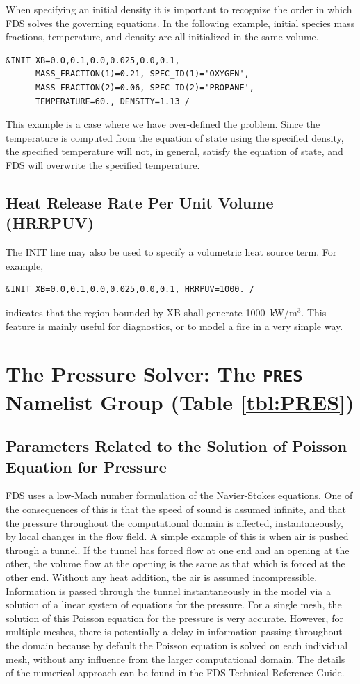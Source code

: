 \documentclass[11pt]{book}
\begin{document}
When specifying an initial density it is important to recognize the order in which FDS solves the governing equations. In the following example, initial species mass fractions, temperature, and density are all initialized in the same volume.
\begin{lstlisting}
&INIT XB=0.0,0.1,0.0,0.025,0.0,0.1,
      MASS_FRACTION(1)=0.21, SPEC_ID(1)='OXYGEN',
      MASS_FRACTION(2)=0.06, SPEC_ID(2)='PROPANE',
      TEMPERATURE=60., DENSITY=1.13 /
\end{lstlisting}
This example is a case where we have over-defined the problem. Since the temperature is computed from the equation of state using the specified density, the specified temperature will not, in general, satisfy the equation of state, and FDS will overwrite the specified temperature.

\subsection*{Heat Release Rate Per Unit Volume (HRRPUV)}

The {\ct INIT} line may also be used to specify a volumetric heat source term. For example,
\begin{lstlisting}
&INIT XB=0.0,0.1,0.0,0.025,0.0,0.1, HRRPUV=1000. /
\end{lstlisting}
indicates that the region bounded by {\ct XB} shall generate 1000~kW/m$^3$. This feature is mainly useful for diagnostics, or to model a fire in a very simple way.



\section{The Pressure Solver: The \texorpdfstring{{\tt PRES}}{PRES} Namelist Group (Table \ref{tbl:PRES})}
\label{info:PRES}

\subsection{Parameters Related to the Solution of Poisson Equation for Pressure}

FDS uses a low-Mach number formulation of the Navier-Stokes equations. One of the consequences of this is that the speed of sound is assumed infinite, and that the pressure throughout the computational domain is affected, instantaneously, by local changes in the flow field. A simple example of this is when air is pushed through a tunnel. If the tunnel has forced flow at one end and an opening at the other, the volume flow at the opening is the same as that which is forced at the other end. Without any heat addition, the air is assumed incompressible. Information is passed through the tunnel instantaneously in the model via a solution of a linear system of equations for the pressure. For a single mesh, the solution of this Poisson equation for the pressure is very accurate. However, for multiple meshes, there is potentially a delay in information passing throughout the domain because by default the Poisson equation is solved on each individual mesh, without any influence from the larger computational domain. The details of the numerical approach can be found in the FDS Technical Reference Guide.
\end{document}
